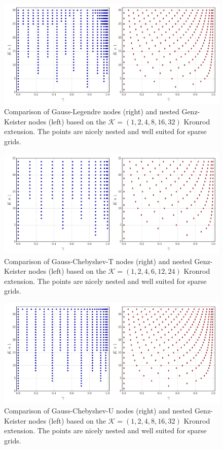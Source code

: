 \documentclass[a4paper,10pt]{article}
\begin{document}
\FloatBarrier

\begin{figure}
  \centering
  \includegraphics[width=\linewidth]{./img/gk_legendre_nodes_cmp.pdf}
  \caption{Comparison of Gauss-Legendre nodes (right) and nested Genz-Keister nodes (left)
  based on the $\mathcal{K} = (1,2,4,8,16,32)$ Kronrod extension. The points are
  nicely nested and well suited for sparse grids.}
  \label{fig:gk_legendre_nodes_cmp}
\end{figure}

\begin{figure}[h]
  \centering
  \includegraphics[width=\linewidth]{./img/gk_chebyshevt_nodes_cmp.pdf}
  \caption{Comparison of Gauss-Chebyshev-T nodes (right) and nested Genz-Keister nodes (left)
  based on the $\mathcal{K} = (1, 2, 4, 6, 12, 24)$ Kronrod extension.
  The points are nicely nested and well suited for sparse grids.}
  \label{fig:gk_chebyshevt_nodes_cmp}
\end{figure}

\begin{figure}[h]
  \centering
  \includegraphics[width=\linewidth]{./img/gk_chebyshevu_nodes_cmp.pdf}
  \caption{Comparison of Gauss-Chebyshev-U nodes (right) and nested Genz-Keister nodes (left)
  based on the $\mathcal{K} = (1,2,4,8,16,32)$ Kronrod extension. The points are
  nicely nested and well suited for sparse grids.}
  \label{fig:gk_chebyshevu_nodes_cmp}
\end{figure}
\end{document}
